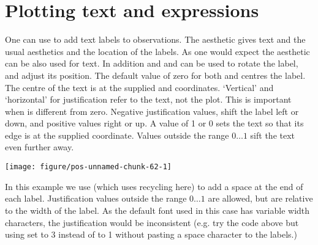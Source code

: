 \documentclass[paper=a4,headsepline,BCOR=12mm,twoside,open=right,%
titlepage,headings=small,fontsize=10pt,index=totoc,bibliography=totoc,%
captions=tableheading,captions=nooneline]{scrbook}\usepackage{knitr}
\begin{document}
\section{Plotting text and expressions}

One can use  to add text labels to observations. The aesthetic  gives text and the usual aesthetics  and  the location of the labels. As one would expect the  aesthetic can be also used for text. In addition  and  and  can be used to rotate the label, and adjust its position. The default value of zero for both  and  centres the label. The centre of the text is at the supplied  and  coordinates. `Vertical' and `horizontal' for justification refer to the text, not the plot. This is important when  is different from zero. Negative justification values, shift the label left or down, and positive values right or up. A value of 1 or 0 sets the text so that its edge is at the supplied coordinate. Values outside the range $0\ldots 1$ sift the text even further away.

\begin{knitrout}\footnotesize
{}\color{fgcolor}\begin{kframe}
\begin{alltt}
 \hlkwb{<-}
  \hlstd{(}\hlstd{=}\hlopt{:}\hlstd{,} \hlstd{=}\hlstd{(}\hlstd{,} \hlstd{),}
             \hlstd{=}\hlstd{(letters[}\hlopt{:}\hlstd{],} \hlstd{))}

  \hlopt{+}
  \hlstd{(}\hlstd{=}\hlstd{,} \hlstd{=}\hlstd{)} \hlopt{+} \hlstd{()}
\end{alltt}
\end{kframe}

{\centering \texttt{[image: figure/pos-unnamed-chunk-62-1]} 

}



\end{knitrout}

In this example we use  (which uses recycling here) to add a space at the end of each label. Justification values outside the range $0\ldots 1$ are allowed, but are relative to the width of the label. As the default font used in this case has variable width characters, the justification would be inconsistent (e.g. try the code above but using  set to 3 instead of to 1 without pasting a space character to the labels.)
\end{document}

